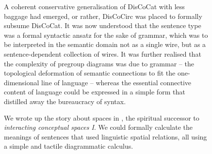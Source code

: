 \begin{figure}[h!]
\centering
{}
\caption{A coherent conservative generalisation of DisCoCat with less baggage had emerged, or rather, DisCoCirc was placed to formally subsume DisCoCat. It was now understood that the sentence type was a formal syntactic ansatz for the sake of grammar, which was to be interpreted in the semantic domain not as a single wire, but as a sentence-dependent collection of wires. It was further realised that the complexity of pregroup diagrams was due to grammar -- the topological deformation of semantic connections to fit the one-dimensional line of language -- whereas the essential connective content of language could be expressed in a simple form that distilled away the bureaucracy of syntax.}
\end{figure}

\begin{figure}[h!]
\centering
{}
\caption{We wrote up the story about spaces in \citep{wang-mascianicaTalkingSpaceInference2021a}, the spiritual successor to \emph{interacting conceptual spaces I}. We could formally calculate the meanings of sentences that used linguistic spatial relations, all using a simple and tactile diagrammatic calculus.}
\end{figure}

